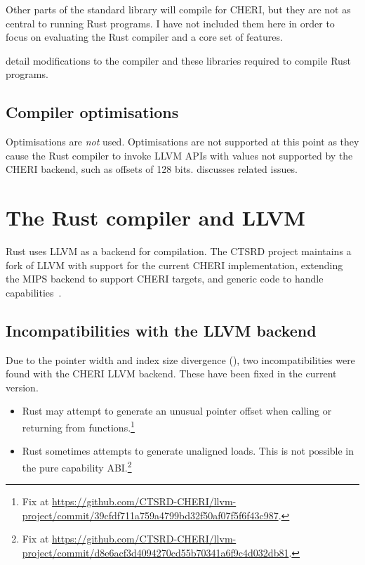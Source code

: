 \documentclass[dissertation.tex]{subfiles}
\begin{document}
Other parts of the standard library will compile for CHERI, but they are
not as central to running Rust programs.
I have not included them here in order to focus on evaluating the Rust
compiler and a core set of features.

 detail modifications to
the compiler and these libraries required to compile Rust programs.

\subsection{Compiler optimisations}
Optimisations are \emph{not} used.
Optimisations are not supported at this point as they cause the Rust
compiler to invoke LLVM APIs with values not supported by the CHERI
backend, such as offsets of 128 bits.
 discusses related issues.


\section{The Rust compiler and LLVM}
\label{sec:impl-rustllvm}

Rust uses LLVM as a backend for compilation.
The CTSRD project maintains a fork of LLVM with support for the
current CHERI implementation, extending the MIPS backend to
support CHERI targets, and generic code to handle
capabilities~\cite{cheri-prog-guide}.

\subsection{Incompatibilities with the LLVM backend}
Due to the pointer width and index size divergence
(), two incompatibilities were found with the CHERI
LLVM backend.
These have been fixed in the current version.

\begin{itemize}
    \item Rust may attempt to generate an unusual pointer offset when
    calling or returning from functions.\footnote{Fix at \url{https://github.com/CTSRD-CHERI/llvm-project/commit/39cfdf711a759a4799bd32f50af07f5f6f43c987}.}
    \item Rust sometimes attempts to generate unaligned loads.
    This is not possible in the pure capability ABI.\footnote{Fix at \url{https://github.com/CTSRD-CHERI/llvm-project/commit/d8e6acf3d4094270cd55b70341a6f9c4d032db81}.}
\end{itemize}
\end{document}
